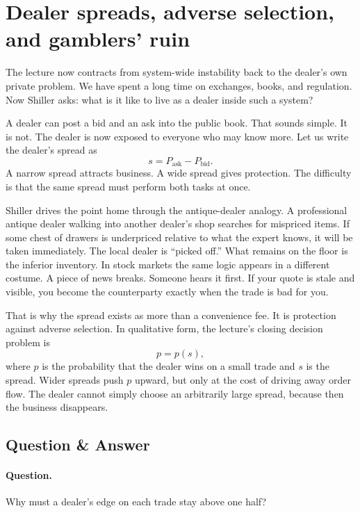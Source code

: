 \section{Dealer spreads, adverse selection, and gamblers' ruin}

The lecture now contracts from system-wide instability back to the dealer's own private problem. We have spent a long time on exchanges, books, and regulation. Now Shiller asks: what is it like to live as a dealer inside such a system?

A dealer can post a bid and an ask into the public book. That sounds simple. It is not. The dealer is now exposed to everyone who may know more. Let us write the dealer's spread as
\begin{equation}
s = P_{\text{ask}} - P_{\text{bid}}.
\end{equation}
A narrow spread attracts business. A wide spread gives protection. The difficulty is that the same spread must perform both tasks at once.

Shiller drives the point home through the antique-dealer analogy. A professional antique dealer walking into another dealer's shop searches for mispriced items. If some chest of drawers is underpriced relative to what the expert knows, it will be taken immediately. The local dealer is ``picked off.'' What remains on the floor is the inferior inventory. In stock markets the same logic appears in a different costume. A piece of news breaks. Someone hears it first. If your quote is stale and visible, you become the counterparty exactly when the trade is bad for you.

That is why the spread exists as more than a convenience fee. It is protection against adverse selection. In qualitative form, the lecture's closing decision problem is
\begin{equation}
p = p(s),
\end{equation}
where \(p\) is the probability that the dealer wins on a small trade and \(s\) is the spread. Wider spreads push \(p\) upward, but only at the cost of driving away order flow. The dealer cannot simply choose an arbitrarily large spread, because then the business disappears.

\subsection{Question \& Answer}

\paragraph{Question.} Why must a dealer's edge on each trade stay above one half?

